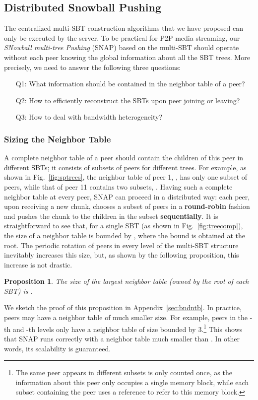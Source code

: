 \documentclass[conference]{IEEEtran}
\newtheorem{prop}{Proposition}
\begin{document}
\subsection{Distributed Snowball Pushing}
The centralized multi-SBT construction algorithms that we have proposed can only be executed by the server. To be practical for P2P media streaming, our \textit{SNowball multi-tree  Pushing} (SNAP) based on the multi-SBT should operate without each peer knowing the global information about all the SBT trees. More precisely, we need to answer the following three questions:
\begin{itemize}
\item [Q1:] What information should be contained in the neighbor table of a peer?
\item [Q2:] How to efficiently reconstruct the SBTs upon peer joining or leaving?
\item [Q3:] How to deal with bandwidth heterogeneity?
  \end{itemize}

\subsubsection{Sizing the Neighbor Table}
  A complete neighbor table of a peer should contain the children of this peer in different SBTs; it consists of subsets of peers for different trees. For example, as shown in Fig.~\ref{fig:sptrees}, the neighbor table of peer 1, , has only one subset of peers, while that of peer 11 contains two subsets, . Having such a complete neighbor table at every peer, SNAP can proceed in a distributed way: each peer, upon receiving a new chunk, chooses a subset of peers in a \textbf{round-robin} fashion and pushes the chunk to the children in the subset \textbf{sequentially}. It is straightforward to see that, for a single SBT (as shown in Fig.~\ref{fig:treecomp}), the size of a neighbor table is bounded by , where the bound is obtained at the root. The periodic rotation of peers in every level of the multi-SBT structure inevitably increases this size, but, as shown by the following proposition, this increase is not drastic.
\vspace{1ex}
  \begin{prop} \label{prop:nbsizebd}
    The size of the largest neighbor table (owned by the root of each SBT) is .
  \end{prop}
  \vspace{1ex}
We sketch the proof of this proposition in Appendix~\ref{sec:bndntb}. In practice, peers may have a neighbor table of much smaller size. For example, peers in the -th and -th levels only have a neighbor table of size bounded by 3.\footnote{The same peer appears in different subsets is only counted once, as the information about this peer only occupies a single memory block, while each subset containing the peer uses a reference to refer to this memory block.} This shows that SNAP runs correctly with a neighbor table much smaller than . In other words, its scalability is guaranteed.
\end{document}
